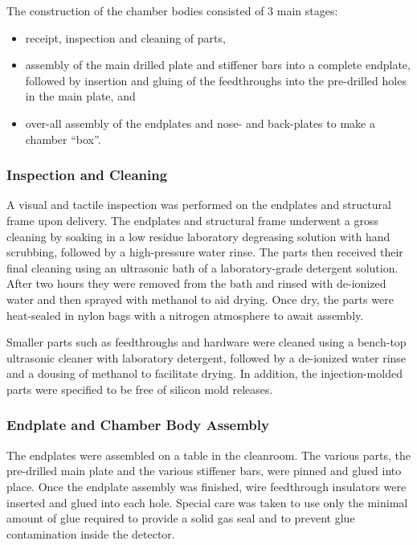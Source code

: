 The construction of the chamber bodies consisted of 3 main stages:
\begin{itemize}
\item receipt, inspection and cleaning of parts,
\item assembly of the main drilled plate and stiffener bars into a complete endplate,
followed by insertion and gluing of the feedthroughs into the pre-drilled holes 
in the main plate, and 
\item over-all assembly of the endplates and nose- and back-plates to make
a chamber ``box''.
\end{itemize}

\subsubsection{Inspection and Cleaning}

A visual and tactile inspection was performed on the endplates and 
structural frame upon delivery.  The endplates and structural 
frame underwent a gross cleaning by soaking in a low residue laboratory 
degreasing solution with hand scrubbing, followed by a high-pressure water 
rinse. The parts then received their final cleaning using an ultrasonic 
bath of a laboratory-grade detergent solution.  After two hours they were
removed from the bath and rinsed with de-ionized water and then sprayed 
with methanol to aid drying. Once dry, the parts were heat-sealed in nylon 
bags with a nitrogen atmosphere to await assembly.

Smaller parts such as feedthroughs and hardware were cleaned using a 
bench-top ultrasonic cleaner with laboratory detergent, followed by a 
de-ionized water rinse and a dousing of methanol to facilitate drying.  
In addition, the injection-molded parts were specified to be free of silicon 
mold releases.
 
\subsubsection{Endplate and Chamber Body Assembly}
The endplates were assembled on a table in the cleanroom.  The various parts,
the pre-drilled main plate and the various stiffener bars, were pinned
and glued into place.  
Once the endplate assembly was finished,
wire feedthrough insulators were inserted and glued into each hole. Special care was 
taken to use only the minimal amount of glue required to provide a solid gas 
seal and to prevent glue contamination inside the detector.  

